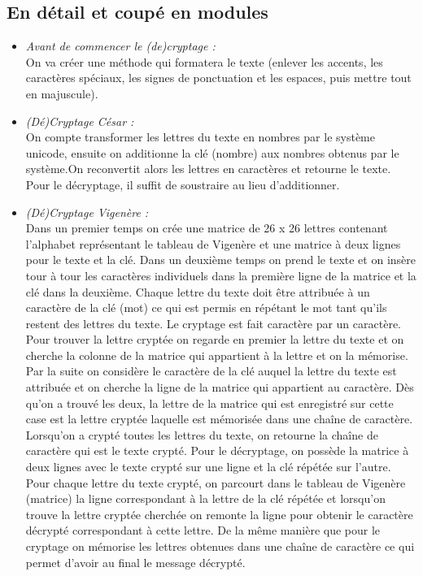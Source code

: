 \documentclass[a4paper,12pt,abstracton,titlepage]{scrartcl}
\begin{document}
\subsection{En détail et coupé en modules}
\begin{itemize}
\item \textit{Avant de commencer le (de)cryptage :}\\
On va créer une méthode qui formatera le texte (enlever les accents, les caractères spéciaux, les signes de ponctuation et les espaces, puis mettre tout en majuscule).\\
\item \textit{(Dé)Cryptage César :}\\
On compte transformer les lettres du texte en nombres par le système unicode, ensuite on additionne la clé (nombre) aux nombres obtenus par le système.On reconvertit alors les lettres en caractères et retourne le texte.
Pour le décryptage, il suffit de soustraire au lieu d'additionner.\\
\item \textit{(Dé)Cryptage Vigenère :}\\
Dans un premier temps on crée une matrice de 26 x 26 lettres contenant l’alphabet représentant le tableau de Vigenère et une matrice à deux lignes pour le texte et la clé. Dans un deuxième temps on prend le texte et on insère tour à tour les caractères individuels dans la première ligne de la matrice et la clé dans la deuxième. Chaque lettre du texte doit être attribuée à un caractère de la clé (mot) ce qui est permis en répétant le mot tant qu’ils restent des lettres du texte.
Le cryptage est fait caractère par un caractère. Pour trouver la lettre cryptée on regarde en premier la lettre du texte et on cherche la colonne de la matrice qui appartient à la lettre et on la mémorise. Par la suite on considère le caractère de la clé auquel la lettre du texte est attribuée et on cherche la ligne de la matrice qui appartient au caractère. Dès qu’on a trouvé les deux, la lettre de la matrice qui est enregistré sur cette case est la lettre cryptée laquelle est mémorisée dans une chaîne de caractère. Lorsqu’on a crypté toutes les lettres du texte, on retourne la chaîne de caractère qui est le texte crypté.
Pour le décryptage, on possède la matrice à deux lignes avec le texte crypté sur une ligne et la clé répétée sur l’autre. Pour chaque lettre du texte crypté, on parcourt dans le tableau de Vigenère (matrice) la ligne correspondant à la lettre de la clé répétée et lorsqu’on  trouve la lettre cryptée cherchée on remonte la ligne pour obtenir le caractère décrypté correspondant à cette lettre. De la même manière que pour le cryptage on mémorise les lettres obtenues dans une chaîne de caractère ce qui permet d’avoir au final le message décrypté.\\

\end{itemize}
\end{document}

